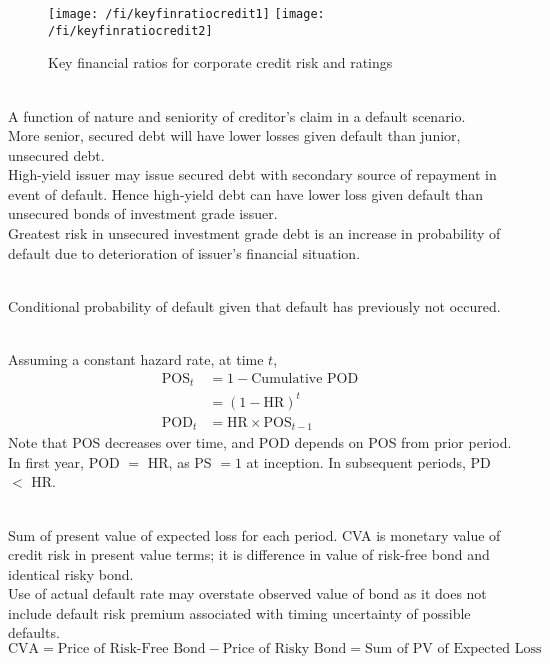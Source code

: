 \begin{figure}[H]
\centering
\texttt{[image: /fi/keyfinratiocredit1]}
\texttt{[image: /fi/keyfinratiocredit2]}
\caption{Key financial ratios for corporate credit risk and ratings}
\end{figure}

\begin{remark} \\
A function of nature and seniority of creditor's claim in a default scenario.\\
More senior, secured debt will have lower losses given default than junior, unsecured debt.\\
High-yield issuer may issue secured debt with secondary source of repayment in event of default. Hence high-yield debt can have lower loss given default than unsecured bonds of investment grade issuer.\\
Greatest risk in unsecured investment grade debt is an increase in probability of default due to deterioration of issuer's financial situation.
\end{remark}

\begin{definition} \\
Conditional probability of default given that default has previously not occured.
\end{definition}

\begin{definition} \\
Assuming a constant hazard rate, at time $t$, 
\begin{align}
\text{POS}_t &= 1 - \text{Cumulative POD} \nonumber \\
&= (1-\text{HR})^t \nonumber \\
\text{POD}_t &= \text{HR} \times \text{POS}_{t-1} \nonumber
\end{align}
Note that POS decreases over time, and POD depends on POS from prior period.\\
In first year, POD $=$ HR, as PS $=1$ at inception. In subsequent periods, PD $<$ HR.
\end{definition}

\begin{definition} \\
Sum of present value of expected loss for each period. CVA is monetary value of credit risk in present value terms; it is difference in value of risk-free bond and identical risky bond.\\
Use of actual default rate may overstate observed value of bond as it does not include default risk premium associated with timing uncertainty of possible defaults.
\begin{equation}
\text{CVA} = \text{Price of Risk-Free Bond} - \text{Price of Risky Bond} = \text{Sum of PV of Expected Loss}\nonumber
\end{equation}
\end{definition}

